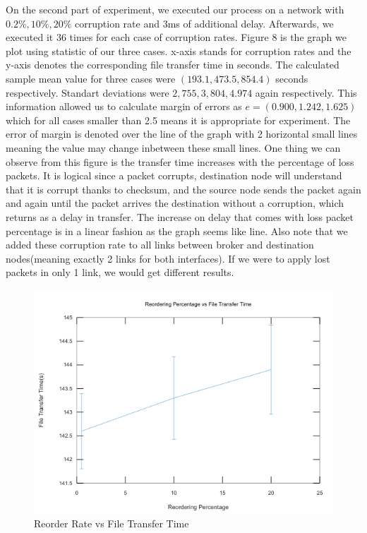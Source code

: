 \documentclass[conference]{IEEEtran}
\begin{document}
On the second part of experiment, we executed our process on a network with $0.2\%,10\%,20\% $ corruption rate and 3ms of additional delay. Afterwards, we executed it $36$ times for each case of corruption rates. Figure 8 is the graph we plot using statistic of our three cases. x-axis stands for corruption rates and the y-axis denotes the corresponding file transfer time in seconds. The calculated sample mean value for three cases were $(193.1 , 473.5 , 854.4)$ seconds respectively. Standart deviations were $2,755, 3,804, 4.974$ again respectively. This information allowed us to calculate margin of errors as $e=(0.900 , 1.242 , 1.625)$ which for all cases smaller than 2.5 means it is appropriate for experiment. The error of margin is denoted over the line of the graph with 2 horizontal small lines meaning the value may change inbetween these small lines. One thing we can observe from this figure is the transfer time increases with the percentage of loss packets. It is logical since a packet corrupts, destination node will understand that it is corrupt thanks to checksum, and the source node sends the packet again and again until the packet arrives the destination without a corruption, which returns as a delay in transfer. The increase on delay that comes with loss packet percentage is in a linear fashion as the graph seems like line. Also note that we added these corruption rate to all links between broker and destination nodes(meaning exactly 2 links for both interfaces). If we were to apply lost packets in only 1 link, we would get different results.  


\begin{figure}[h]
    \centering
    \includegraphics[scale=0.45]{graph3.png}
    \caption{Reorder Rate vs File Transfer Time}
\end{figure}
\end{document}
